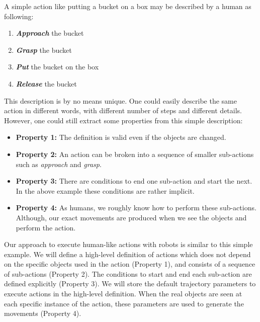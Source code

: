 A simple action like putting a bucket on a box may be described by a human as following:
\begin{enumerate}
  \item \textbf{\textit{Approach}} the bucket
  \item \textbf{\textit{Grasp}} the bucket
  \item \textbf{\textit{Put}} the bucket on the box
  \item \textbf{\textit{Release}} the bucket
\end{enumerate}
This description is by no means unique.
One could easily describe the same action in different words, with different number of steps and different details.
However, one could still extract some properties from this simple description:
\begin{itemize}
  \item \textbf{Property 1:} The definition is valid even if the objects are changed.
  \item \textbf{Property 2:} An action can be broken into a sequence of smaller sub-actions such as \textit{approach} and \textit{grasp}.
  \item \textbf{Property 3:} There are conditions to end one sub-action and start the next. In the above example these conditions are rather implicit.
  \item \textbf{Property 4:} As humans, we roughly know how to perform these sub-actions.
  Although, our exact movements are produced when we see the objects and perform the action.
\end{itemize}


Our approach to execute human-like actions with robots is similar to this simple example.
We will define a high-level definition of actions which does not depend on the specific objects used in the action (Property 1),
and consists of a sequence of sub-actions (Property 2).
The conditions to start and end each sub-action are defined explicitly (Property 3).
We will store the default trajectory parameters to execute actions in the high-level definition.
When the real objects are seen at each specific instance of the action, these parameters are used to generate the movements (Property 4).


